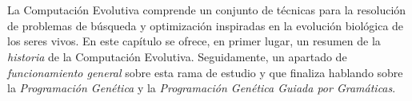 \documentclass[spanish,a4paper,12pt,twoside]{report}
\begin{document}
  \chapter*{\vspace{-3cm}{\LARGE 2. Computación Evolutiva}}
  \vspace{-1cm}
  La Computación Evolutiva comprende un conjunto de técnicas para la resolución de problemas de búsqueda y optimización inspiradas en la evolución biológica de los seres vivos. En este capítulo se ofrece, en primer lugar, un resumen de la \emph{historia} de la Computación Evolutiva. Seguidamente, un apartado de \emph{funcionamiento general} sobre esta rama de estudio y que finaliza hablando sobre la \emph{Programación Genética} y la \emph{Programación Genética Guiada por Gramáticas}.
\end{document}
